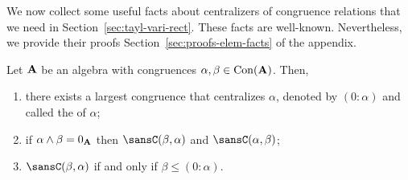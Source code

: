 


We now collect some useful facts about centralizers of congruence relations
that we need in Section~\ref{sec:tayl-vari-rect}.
These facts are well-known. Nevertheless, we provide their proofs 
Section~\ref{sec:proofs-elem-facts} of the appendix. 

\begin{lemma}
\label{lem:centralizers}
Let $\mathbf{A}$ be an algebra with congruences $\alpha, \beta \in \operatorname{Con}(\mathbf{A})$.  Then,
\begin{enumerate}

\item \label{fact:centralizer}  
  there exists a largest congruence that centralizes $\alpha$,
  denoted by $(0:\alpha)$ and called the  of $\alpha$;

\item \label{fact:point-separating_implies_mutually-centralizing}  
  if $\alpha \wedge \beta = 0_{\mathbf{A}}$ then $\sansC(\beta, \alpha)$ and $\sansC(\alpha, \beta)$;

\item \label{fact:centralizing_ideal}
  $\sansC(\beta, \alpha)$ if and only if $\beta \leq (0: \alpha)$.

\end{enumerate}
\end{lemma}



